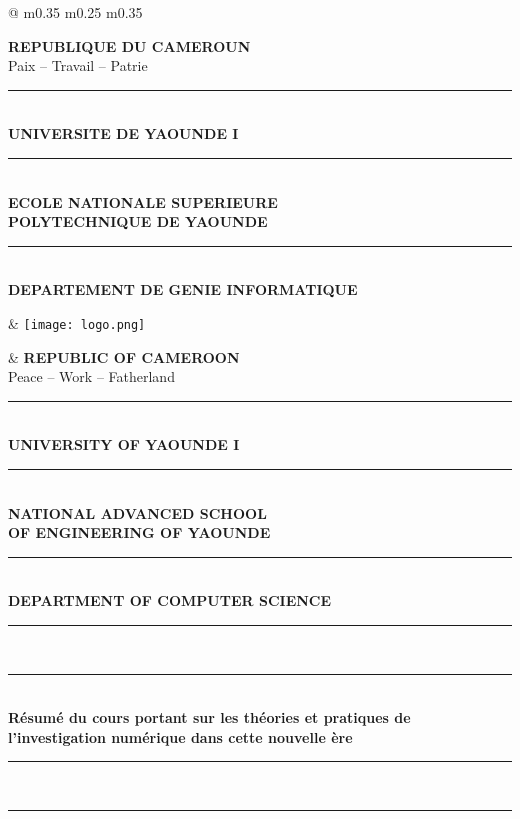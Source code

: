 \documentclass[12pt,a4paper]{article}
\newcommand{\HRule}{\rule{\linewidth}{1pt}}
\newcommand{\DoubleHRule}{\rule{\linewidth}{1.5pt}\\[-0.3em]\rule{\linewidth}{0.8pt}}
\begin{document}
	\thispagestyle{empty} %
	
	\begin{tcolorbox}[
		colback=blue!5,
		colframe=blue!50,
		boxrule=0.8pt,
		arc=4mm,
		left=4mm, right=4mm, top=2mm, bottom=2mm
		]
		
		\begin{tabular*}{\textwidth}{@{\extracolsep{\fill}} m{0.35\textwidth} m{0.25\textwidth} m{0.35\textwidth} }
			
			\centering
			\textbf{REPUBLIQUE DU CAMEROUN}\\
			Paix -- Travail -- Patrie\\
			\HRule \\[0.3em]
			\textbf{UNIVERSITE DE YAOUNDE I}\\
			\HRule \\[0.3em]
			\textbf{ECOLE NATIONALE SUPERIEURE\\POLYTECHNIQUE DE YAOUNDE}\\
			\HRule \\[0.3em]
			\textbf{DEPARTEMENT DE GENIE INFORMATIQUE}
			
			&
			\centering
			\texttt{[image: logo.png]}
			
			&
			\centering
			\textbf{REPUBLIC OF CAMEROON}\\
			Peace -- Work -- Fatherland\\
			\HRule \\[0.3em]
			\textbf{UNIVERSITY OF YAOUNDE I}\\
			\HRule \\[0.3em]
			\textbf{NATIONAL ADVANCED SCHOOL\\OF ENGINEERING OF YAOUNDE}\\
			\HRule \\[0.3em]
			\textbf{DEPARTMENT OF COMPUTER SCIENCE}
			
		\end{tabular*}
	\end{tcolorbox}
	
	\vspace{1.2cm}
	
	\begin{center}
		\DoubleHRule \\[1em]
		{\huge \bfseries Résumé du cours portant sur les théories et pratiques de l’investigation numérique dans cette nouvelle ère }\\[1em]
		\DoubleHRule
	\end{center}
	
\end{document}

